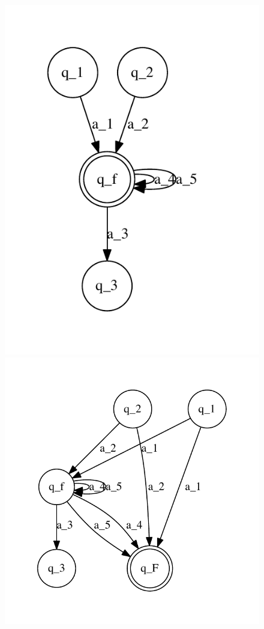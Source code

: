 \documentclass[12pt]{article}
\begin{document}
      \begin{figure}[H]
      \includegraphics{state_machine2_3.pdf}
      \includegraphics{state_machine2_4.pdf}
      \end{figure}
\end{document}
